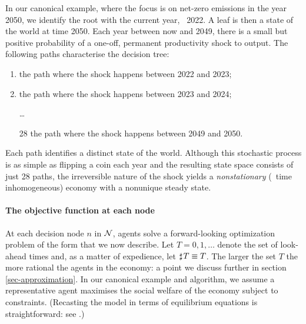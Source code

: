 \documentclass[12pt,a4paper,twoside, draft]{article}
\newcommand{\countof}{\mathbin{\sharp}\hskip1pt}
\begin{document}
\begin{example}\label{eg-irreversible}
   In our canonical example, where the focus is on net-zero emissions in the
   year 2050, we identify the root with the current year, \eg~2022.
   A leaf is then a state of the world at time 2050.
   Each year between now and 2049, there is a small but positive probability of
   a one-off, permanent productivity shock to output.
   The following paths characterise the decision tree:
   \begin{enumerate}[1]
      \item the path where the shock happens between 2022 and 2023;
      \item the path where the shock happens between 2023 and 2024;
      \item[] \dots
      \item[28] the path where the shock happens between 2049 and 2050.
   \end{enumerate}
   Each path identifies a distinct state of the world.
   Although this stochastic process is as simple as flipping a coin
   each year and the resulting state space consists of just 28 paths,
   the irreversible nature of the shock yields a
   \emph{nonstationary} (\ie~time inhomogeneous) economy with a nonunique
   steady state.
\end{example}

\paragraph{The objective function at each node}
At each decision node $n$ in $\mathcal N$, agents solve a forward-looking
optimization problem of the form that we now describe.
Let $T = 0, 1, \dots$ denote the set of look-ahead times and, as a matter of
expedience, let $\countof T \equiv T$.
The larger the set $T$ the more rational the agents in the economy: a point we
discuss further in section \ref{sec-approximation}.
In our canonical example and algorithm, we assume
a representative agent maximises the social welfare of the economy subject to
constraints.
(Recasting the model in terms of equilibrium equations is straightforward:
see \citet[Algorithm 2]{CJ}.)
\end{document}
